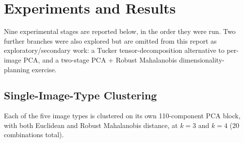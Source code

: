 \documentclass[11pt, a4paper]{article}
\begin{document}
\section{Experiments and Results}

Nine experimental stages are reported below, in the order they were run. Two further branches
were also explored but are omitted from this report as exploratory/secondary work: a Tucker
tensor-decomposition alternative to per-image PCA, and a two-stage PCA + Robust Mahalanobis
dimensionality-planning exercise.

\subsection{Single-Image-Type Clustering}

Each of the five image types is clustered on its own 110-component PCA block, with both Euclidean
and Robust Mahalanobis distance, at $k=3$ and $k=4$ (20 combinations total).
\end{document}
